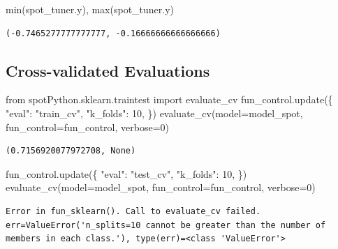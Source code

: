\documentclass[
  letterpaper,
  DIV=11,
  numbers=noendperiod]{scrreprt}
\newenvironment{Shaded}{\begin{snugshade}}{\end{snugshade}}
\newcommand{\BuiltInTok}[1]{\textcolor[rgb]{0.00,0.23,0.31}{#1}}
\newcommand{\DecValTok}[1]{\textcolor[rgb]{0.68,0.00,0.00}{#1}}
\newcommand{\ImportTok}[1]{\textcolor[rgb]{0.00,0.46,0.62}{#1}}
\newcommand{\NormalTok}[1]{\textcolor[rgb]{0.00,0.23,0.31}{#1}}
\newcommand{\OperatorTok}[1]{\textcolor[rgb]{0.37,0.37,0.37}{#1}}
\newcommand{\StringTok}[1]{\textcolor[rgb]{0.13,0.47,0.30}{#1}}
\begin{document}
\begin{Shaded}
\begin{Highlighting}[]
\BuiltInTok{min}\NormalTok{(spot\_tuner.y), }\BuiltInTok{max}\NormalTok{(spot\_tuner.y)}
\end{Highlighting}
\end{Shaded}

\begin{verbatim}
(-0.7465277777777777, -0.16666666666666666)
\end{verbatim}

\hypertarget{cross-validated-evaluations-3}{%
\subsection{Cross-validated
Evaluations}\label{cross-validated-evaluations-3}}

\begin{Shaded}
\begin{Highlighting}[]
\ImportTok{from}\NormalTok{ spotPython.sklearn.traintest }\ImportTok{import}\NormalTok{ evaluate\_cv}
\NormalTok{fun\_control.update(\{}
     \StringTok{"eval"}\NormalTok{: }\StringTok{"train\_cv"}\NormalTok{,}
     \StringTok{"k\_folds"}\NormalTok{: }\DecValTok{10}\NormalTok{,}
\NormalTok{\})}
\NormalTok{evaluate\_cv(model}\OperatorTok{=}\NormalTok{model\_spot, fun\_control}\OperatorTok{=}\NormalTok{fun\_control, verbose}\OperatorTok{=}\DecValTok{0}\NormalTok{)}
\end{Highlighting}
\end{Shaded}

\begin{verbatim}
(0.7156920077972708, None)
\end{verbatim}

\begin{Shaded}
\begin{Highlighting}[]
\NormalTok{fun\_control.update(\{}
     \StringTok{"eval"}\NormalTok{: }\StringTok{"test\_cv"}\NormalTok{,}
     \StringTok{"k\_folds"}\NormalTok{: }\DecValTok{10}\NormalTok{,}
\NormalTok{\})}
\NormalTok{evaluate\_cv(model}\OperatorTok{=}\NormalTok{model\_spot, fun\_control}\OperatorTok{=}\NormalTok{fun\_control, verbose}\OperatorTok{=}\DecValTok{0}\NormalTok{)}
\end{Highlighting}
\end{Shaded}

\begin{verbatim}
Error in fun_sklearn(). Call to evaluate_cv failed. err=ValueError('n_splits=10 cannot be greater than the number of members in each class.'), type(err)=<class 'ValueError'>
\end{verbatim}
\end{document}
